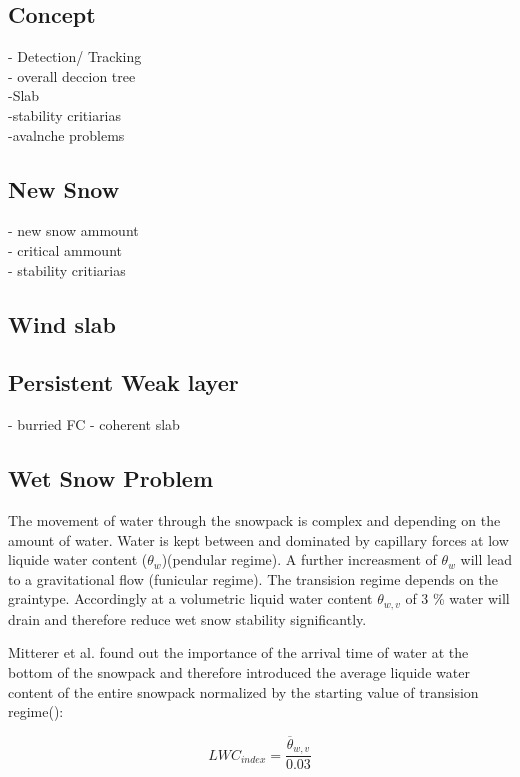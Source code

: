 \subsection{Concept}

- Detection/ Tracking\\
- overall deccion tree\\
-Slab \\
-stability critiarias\\
-avalnche problems




\subsection{New Snow}
- new snow ammount \\
- critical ammount \\
- stability critiarias

\subsection{Wind slab}


\subsection{Persistent Weak layer}
- burried FC 
- coherent slab

\subsection{Wet Snow Problem}
\label{sec:methods_wetsnow}
The movement of water through the snowpack is complex and depending on the amount of water.
Water is kept between and dominated by capillary forces at low liquide water content ($\theta_w$)(pendular regime).
A further increasment of $\theta_w$ will lead to a gravitational flow (funicular regime). The transision regime
depends on the graintype. Accordingly at a volumetric liquid water content $\theta_{w,v}$ of 3 \% water will drain and
therefore reduce wet snow stability significantly.\autocite{mittererOperationalSupportingTool2013} 

\noindent Mitterer et al. found out the importance of the arrival time of water at the bottom of the snowpack and therefore
introduced the average liquide water content of the entire snowpack normalized by the starting value of transision 
regime(\autocite{mittererOperationalSupportingTool2013}):

 \begin{equation}
    LWC_{index} = \frac{  \overline{ \theta}_{w,v }    } {0.03} 
    \label{equ:LWC}
 \end{equation}

